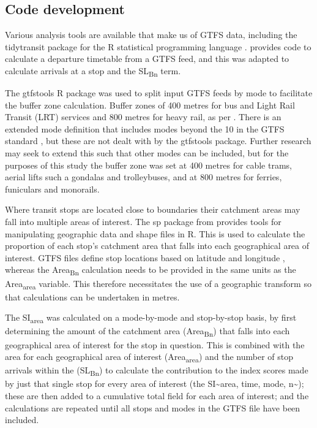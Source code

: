 \documentclass[numbered]{trbunofficial}
\begin{document}
\hypertarget{code-development}{%
\subsection{Code development}\label{code-development}}

Various analysis tools are available that make us of GTFS data,
including the tidytransit package \citep{tidytransit2023} for the R
statistical programming language \citep{R-base}.
\citet{tidytransit_departure_timetable} provides code to calculate a
departure timetable from a GTFS feed, and this was adapted to calculate
arrivals at a stop and the SL\textsubscript{Bn} term.

The gtfstools R package \citep{R-gtfstools} was used to split input GTFS
feeds by mode to facilitate the buffer zone calculation. Buffer zones of
400 metres for bus and Light Rail Transit (LRT) services and 800 metres
for heavy rail, as per \citet{currie2007identifying}. There is an
extended mode definition that includes modes beyond the 10 in the GTFS
standard \citep{filter_GTFS_by_mode}, but these are not dealt with by
the gtfstools package. Further research may seek to extend this such
that other modes can be included, but for the purposes of this study the
buffer zone was set at 400 metres for cable trams, aerial lifts such a
gondalas and trolleybuses, and at 800 metres for ferries, funiculars and
monorails.

Where transit stops are located close to boundaries their catchment
areas may fall into multiple areas of interest. The sp package from
\citep[\citet{applied_spatial_data_analysis_with_R}]{spatial_data_in_R}
provides tools for manipulating geographic data and shape files in R.
This is used to calculate the proportion of each stop's catchment area
that falls into each geographical area of interest. GTFS files define
stop locations based on latitude and longitude
\citep{GTFS_schedule_reference}, whereas the Area\textsubscript{Bn}
calculation needs to be provided in the same units as the
Area\textsubscript{area} variable. This therefore necessitates the use
of a geographic transform so that calculations can be undertaken in
metres.

The SI\textsubscript{area} was calculated on a mode-by-mode and
stop-by-stop basis, by first determining the amount of the catchment
area (Area\textsubscript{Bn}) that falls into each geographical area of
interest for the stop in question. This is combined with the area for
each geographical area of interest (Area\textsubscript{area}) and the
number of stop arrivals within the (SL\textsubscript{Bn}) to calculate
the contribution to the index scores made by just that single stop for
every area of interest (the SI\textasciitilde area, time, mode,
n\textasciitilde); these are then added to a cumulative total field for
each area of interest; and the calculations are repeated until all stops
and modes in the GTFS file have been included.
\end{document}
